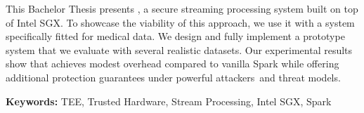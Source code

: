 This Bachelor Thesis presents \projName, a secure streaming processing system built on top of Intel SGX. To showcase the viability of this approach, we use it with a system specifically fitted for medical data. We design and fully implement a prototype system that we evaluate with several realistic datasets. Our experimental results show that \projName achieves modest overhead compared to vanilla Spark while offering additional protection guarantees under powerful attackers and threat models.

\vspace{0.5cm}

\textbf{Keywords:} TEE, Trusted Hardware, Stream Processing, Intel SGX, Spark

\vfill
